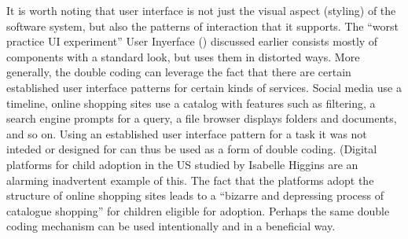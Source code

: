 It is worth noting that user interface is not just the visual aspect (styling) of the software
system, but also the patterns of interaction that it supports. The ``worst practice UI experiment''
User Inyerface () discussed earlier consists mostly of components with a
standard look, but uses them in distorted ways. More generally, the double coding can leverage
the fact that there are certain established user interface patterns for certain kinds of services.
Social media use a timeline, online shopping sites use a catalog with features such as filtering,
a search engine prompts for a query, a file browser displays folders and documents, and so on.
Using an established user interface pattern for a task it was not inteded or designed for can
thus be used as a form of double coding. (Digital platforms for child adoption in the US
studied by Isabelle Higgins are an alarming inadvertent example of this. The fact that the
platforms adopt the structure of online shopping sites leads to a ``bizarre and depressing process
of catalogue shopping'' for children eligible for adoption.
Perhaps the same double coding mechanism can be used intentionally and in a beneficial way.

